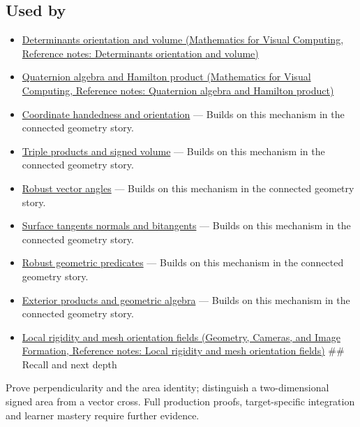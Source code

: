\subsection{Used by}\label{appendix-2391db8052b1-used-by}

\hypertarget{appendix-2391db8052b1-used-by}{}

\begin{itemize}
\item
  \href{../02-Mathematics-for-Visual-Computing/main.pdf\#nameddest=appendix-da478be01d02}{Determinants orientation and volume (Mathematics for Visual Computing, Reference notes: Determinants orientation and volume)}
\item
  \href{../02-Mathematics-for-Visual-Computing/main.pdf\#nameddest=appendix-965d9260eeab}{Quaternion algebra and Hamilton product (Mathematics for Visual Computing, Reference notes: Quaternion algebra and Hamilton product)}
\item
  \hyperref[appendix-87d7626c8d37]{Coordinate handedness and orientation} --- Builds on this mechanism in the connected geometry story.
\item
  \hyperref[appendix-5caa058bd9c7]{Triple products and signed volume} --- Builds on this mechanism in the connected geometry story.
\item
  \hyperref[appendix-e569e60e18e6]{Robust vector angles} --- Builds on this mechanism in the connected geometry story.
\item
  \hyperref[appendix-e31893dec985]{Surface tangents normals and bitangents} --- Builds on this mechanism in the connected geometry story.
\item
  \hyperref[appendix-341296fb3f64]{Robust geometric predicates} --- Builds on this mechanism in the connected geometry story.
\item
  \hyperref[appendix-e1960925d1b8]{Exterior products and geometric algebra} --- Builds on this mechanism in the connected geometry story.
\item
  \href{../03-Geometry-Cameras-and-Image-Formation/main.pdf\#nameddest=appendix-7107009c505b}{Local rigidity and mesh orientation fields (Geometry, Cameras, and Image Formation, Reference notes: Local rigidity and mesh orientation fields)} \#\# Recall and next depth
\end{itemize}

Prove perpendicularity and the area identity; distinguish a two-dimensional signed area from a vector cross. Full production proofs, target-specific integration and learner mastery require further evidence.

